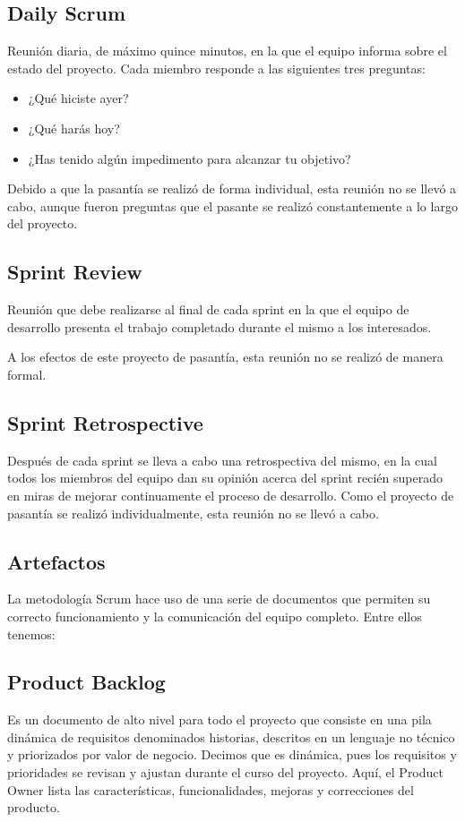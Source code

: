 \subsection{Daily Scrum}
Reunión diaria, de máximo quince minutos, en la que el equipo informa sobre el estado del proyecto. Cada miembro responde a las siguientes tres preguntas:

\begin{itemize}
	\item 	¿Qué hiciste ayer?
	\item 	¿Qué harás hoy?
	\item 	¿Has tenido algún impedimento para alcanzar tu objetivo?
\end{itemize}

Debido a que la pasantía se realizó de forma individual, esta reunión no se llevó a cabo, aunque fueron preguntas que el pasante se realizó constantemente a lo largo del proyecto.

\subsection{Sprint Review}
Reunión que debe realizarse al final de cada sprint en la que el equipo de desarrollo presenta el trabajo completado durante el mismo a los interesados.

A los efectos de este proyecto de pasantía, esta reunión no se realizó de manera formal.

\subsection{Sprint Retrospective}
Después de cada sprint se lleva a cabo una retrospectiva del mismo, en la cual todos los miembros del equipo dan su opinión acerca del sprint recién superado en miras de mejorar continuamente el proceso de desarrollo. Como el proyecto de pasantía se realizó individualmente, esta reunión no se llevó a cabo.

\subsection{Artefactos}
La metodología Scrum hace uso de una serie de documentos que permiten su correcto funcionamiento y la comunicación del equipo completo. Entre ellos tenemos:

\subsection{Product Backlog}
Es un documento de alto nivel para todo el proyecto que consiste en una pila dinámica de requisitos denominados historias, descritos en un lenguaje no técnico y priorizados por valor de negocio. Decimos que es dinámica, pues los requisitos y prioridades se revisan y ajustan durante el curso del proyecto. Aquí, el Product Owner lista las características, funcionalidades, mejoras y correcciones del producto.

